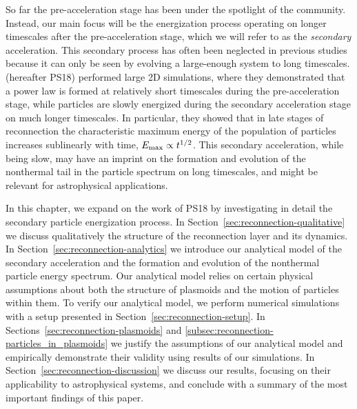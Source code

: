 So far the pre-acceleration stage has been under the spotlight of the community. Instead, our main focus will be the energization process operating on longer timescales after the pre-acceleration stage, which we will refer to as the {\it secondary} acceleration. This secondary process has often been neglected in previous studies because it can only be seen by evolving a large-enough system to long timescales. \citealt{2018MNRAS.481.5687P} (hereafter PS18) performed large 2D simulations, where they demonstrated that a power law is formed at relatively short timescales during the pre-acceleration stage, while particles are slowly energized during the secondary acceleration stage on much longer timescales. In particular, they showed that in late stages of reconnection the characteristic maximum energy of the population of particles increases sublinearly with time, $E_{\rm max} \propto t^{1/2}$. This secondary acceleration, while being slow, may have an imprint on the formation and evolution of the nonthermal tail in the particle spectrum on long timescales, and might be relevant for astrophysical applications. 

In this chapter, we expand on the work of PS18 by investigating in detail the secondary particle energization process. In Section~\ref{sec:reconnection-qualitative}  we discuss qualitatively the structure of the reconnection layer and its dynamics. In Section~\ref{sec:reconnection-analytics} we introduce our analytical model of the secondary acceleration and the formation and evolution of the nonthermal particle energy spectrum. Our analytical model relies on certain physical assumptions about both the structure of plasmoids and the motion of particles within them. To verify our analytical model, we perform numerical simulations with a setup presented in Section~\ref{sec:reconnection-setup}. In Sections~\ref{sec:reconnection-plasmoids} and  \ref{subsec:reconnection-particles_in_plasmoids} we justify the assumptions of our analytical model and empirically demonstrate their validity using results of our simulations. In Section~\ref{sec:reconnection-discussion} we discuss our results, focusing on their applicability to astrophysical systems, and conclude with a summary of the most important findings of this paper.

